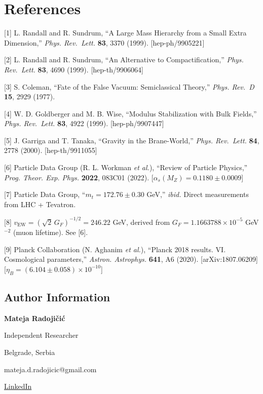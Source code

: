 \documentclass[
  11pt,
]{article}
\begin{document}
\hypertarget{references-1}{%
\section{References}\label{references-1}}

{[}1{]} L. Randall and R. Sundrum, ``A Large Mass Hierarchy from a Small
Extra Dimension,'' \emph{Phys. Rev.~Lett.} \textbf{83}, 3370 (1999).
{[}hep-ph/9905221{]}

{[}2{]} L. Randall and R. Sundrum, ``An Alternative to
Compactification,'' \emph{Phys. Rev.~Lett.} \textbf{83}, 4690 (1999).
{[}hep-th/9906064{]}

{[}3{]} S. Coleman, ``Fate of the False Vacuum: Semiclassical Theory,''
\emph{Phys. Rev.~D} \textbf{15}, 2929 (1977).

{[}4{]} W. D. Goldberger and M. B. Wise, ``Modulus Stabilization with
Bulk Fields,'' \emph{Phys. Rev.~Lett.} \textbf{83}, 4922 (1999).
{[}hep-ph/9907447{]}

{[}5{]} J. Garriga and T. Tanaka, ``Gravity in the Brane-World,''
\emph{Phys. Rev.~Lett.} \textbf{84}, 2778 (2000). {[}hep-th/9911055{]}

{[}6{]} Particle Data Group (R. L. Workman \emph{et al.}), ``Review of
Particle Physics,'' \emph{Prog. Theor. Exp. Phys.} \textbf{2022}, 083C01
(2022). {[}\(\alpha_s(M_Z) = 0.1180 \pm 0.0009\){]}

{[}7{]} Particle Data Group, ``\(m_t = 172.76 \pm 0.30\) GeV,''
\emph{ibid.} Direct measurements from LHC + Tevatron.

{[}8{]} \(v_{\text{EW}} = (\sqrt{2}\,G_F)^{-1/2} = 246.22\) GeV, derived
from \(G_F = 1.1663788 \times 10^{-5}\) GeV\(^{-2}\) (muon lifetime).
See {[}6{]}.

{[}9{]} Planck Collaboration (N. Aghanim \emph{et al.}), ``Planck 2018
results. VI. Cosmological parameters,'' \emph{Astron. Astrophys.}
\textbf{641}, A6 (2020). {[}arXiv:1807.06209{]}
{[}\(\eta_B = (6.104 \pm 0.058) \times 10^{-10}\){]}

\bigskip

\bigskip

\hypertarget{author-information}{%
\subsection{Author Information}\label{author-information}}

\textbf{Mateja Radojičić}

Independent Researcher

Belgrade, Serbia

mateja.d.radojicic@gmail.com

\href{https://www.linkedin.com/in/mateja-radojicic/}{LinkedIn}
\end{document}
